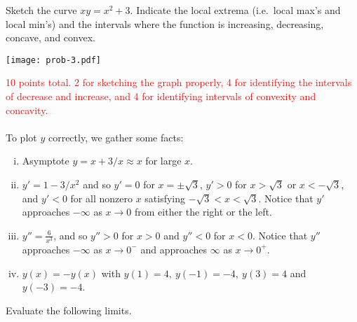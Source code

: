\documentclass[12pt]{article}
\begin{document}
\newpage
\noindent
{} Sketch the curve $xy = x^2 + 3$.
Indicate the local extrema (i.e.\ local max's and
local min's) and the intervals where the function is
increasing, decreasing, concave, and convex. 
\vspace{-16em}
\begin{center}
    \texttt{[image: prob-3.pdf]}
\end{center}
\vspace{-16em}

\noindent
\textcolor{red}{\Large 10 points total. 2 for sketching the graph properly, 4 for identifying the intervals of decrease and increase, and 4 for
        identifying intervals of convexity and concavity.}
\\
\\
To plot $y$ correctly, we gather some facts:
\begin{enumerate}[i)]
\item{}
    Asymptote $y= x + 3/x \approx x$ for large $x$. 
    \item{}
      $ \displaystyle y' = 1 - 3/x^{2}$ and so $y'=0$ for $x = \pm \sqrt{3}$, $y' > 0$ for $x > \sqrt{3}$ or $x < -\sqrt{3}$, and $y' < 0$ for all nonzero $x$ satisfying $- \sqrt{3} < x < \sqrt{3}$. Notice that $y'$ approaches $- \infty$ as $x \to 0$ from either the right or the left.
    \item{} $\displaystyle y'' = \frac{6}{x^{3}}$, and so $y'' > 0$ for $x > 0$ and $y'' < 0$ for $x < 0$. Notice that $y''$ approaches $-\infty$ as $x \to 0^{-}$ and approaches $\infty$ as $x \to 0^{+}$.
        \item{}
       $y(x) = -y(x)$ with $y(1) = 4, \ y(-1) = -4, \ y(3) = 4$ and  $y(-3) = -4$.
\end{enumerate}
\newpage
\noindent
{} Evaluate the following limits. 
\end{document}
